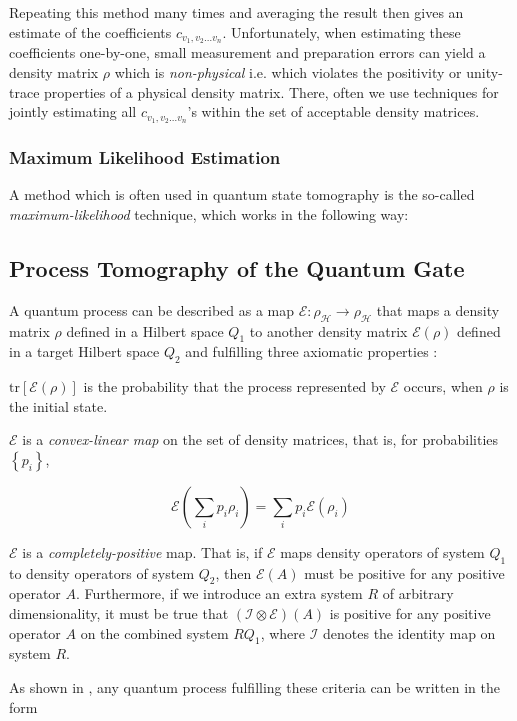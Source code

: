 Repeating this method many times and averaging the result then gives an estimate of the coefficients $c_{v_1,v_2\hdots v_n}$. Unfortunately, when estimating these coefficients one-by-one, small measurement and preparation errors can yield a density matrix $\rho$ which is {\it non-physical} i.e. which violates the positivity or unity-trace properties of a physical density matrix. There, often we use techniques for jointly estimating all $c_{v_1,v_2\hdots v_n}$'s within the set of acceptable density matrices.

\subsubsection{Maximum Likelihood Estimation}

A method which is often used in quantum state tomography is the so-called {\it maximum-likelihood} technique, which works in the following way:

\subsection{Process Tomography of the Quantum Gate}

A quantum process can be described as a map $\mathcal{E} : \rho_\mathcal{H} \to \rho_\mathcal{H}$ that maps a density matrix $\rho$ defined in a Hilbert space $Q_1$ to another density matrix $\mathcal{E}(\rho)$ defined in a target Hilbert space $Q_2$ and fulfilling three axiomatic properties \cite{michael_a._nielsen_quantum_2000}:

\begin{axiom}
$\mathrm{tr}\left[\mathcal{E}(\rho)\right]$ is the probability that the process represented by $\mathcal{E}$ occurs, when $\rho$ is the initial state.
\end{axiom}

\begin{axiom}
$\mathcal{E}$ is a {\it convex-linear map} on the set of density matrices, that is, for probabilities $\left\{p_i\right\}$,

  \begin{equation}
	  \mathcal{E}\left(\sum\limits_i p_i \rho_i\right) = \sum\limits_i p_i \mathcal{E}(\rho_i)
	\end{equation}
\end{axiom}

\begin{axiom}
$\mathcal{E}$ is a {\it completely-positive} map. That is, if $\mathcal{E}$  maps density operators of system $Q_1$ to density operators of system $Q_2$, then $\mathcal{E}(A)$ must be positive for any positive operator $A$. Furthermore, if we introduce an extra system $R$ of arbitrary dimensionality, it must be true that $(\mathcal{I}\otimes \mathcal{E})(A)$ is positive for any positive operator $A$ on the combined system $RQ_1$, where $\mathcal{I}$ denotes the identity map on system $R$.
\end{axiom}
As shown in \cite{michael_a._nielsen_quantum_2000}, any quantum process fulfilling these criteria can be written in the form

